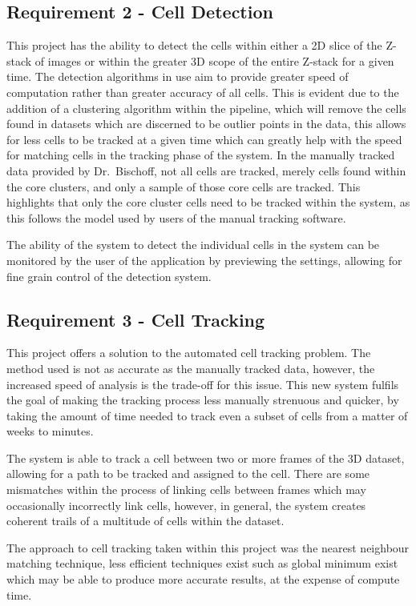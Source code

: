 \documentclass[12pt a4paper]{article}
\begin{document}
\subsection{Requirement 2 - Cell Detection}
This project has the ability to detect the cells within either a 2D slice of the Z-stack of images or within the greater 3D scope of the entire Z-stack for a given time. 
The detection algorithms in use aim to provide greater speed of computation rather than greater accuracy of all cells. This is evident due to the addition of a clustering algorithm within the pipeline, which will remove the cells found in datasets which are discerned to be outlier points in the data, this allows for less cells to be tracked at a given time which can greatly help with the speed for matching cells in the tracking phase of the system.
In the manually tracked data provided by Dr.~Bischoff,  not all cells are tracked, merely cells found within the core clusters, and only a sample of those core cells are tracked. This highlights that only the core cluster cells need to be tracked within the system, as this follows the model used by users of the manual tracking software.

The ability of the system to detect the individual cells in the system can be monitored by the user of the application by previewing the settings, allowing for fine grain control of the detection system.
\subsection{Requirement 3 - Cell Tracking}
This project offers a solution to the automated cell tracking problem. The method used is not as accurate as the manually tracked data, however, the increased speed of analysis is the trade-off for this issue. This new system fulfils the goal of making the tracking process less manually strenuous and quicker, by taking the amount of time needed to track even a subset of cells from a matter of weeks to minutes. 

The system is able to track a cell between two or more frames of the 3D dataset, allowing for a path to be tracked and assigned to the cell. There are some mismatches within the process of linking cells between frames which may occasionally incorrectly link cells, however, in general, the system creates coherent trails of a multitude of cells within the dataset.

The approach to cell tracking taken within this project was the nearest neighbour matching technique, less efficient techniques exist such as global minimum exist which may be able to produce more accurate results, at the expense of compute time. 
\end{document}
